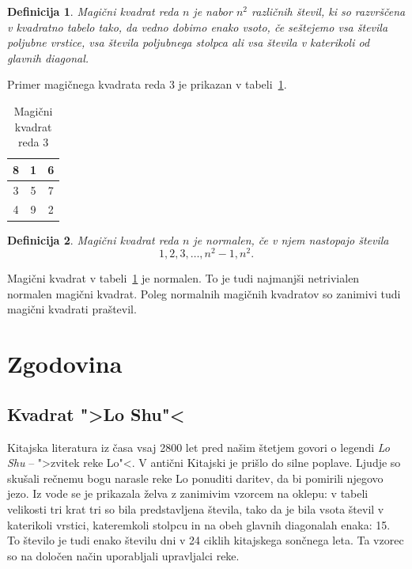 \documentclass[a4paper,12pt]{article}
\newtheorem{definicija}{Definicija}
\begin{document}
\begin{definicija}
   \emph{Magični kvadrat} reda \(n\) je nabor \(n^2\) različnih števil,
   ki so razvrščena v kvadratno tabelo tako, da vedno dobimo enako vsoto,
   če seštejemo vsa števila poljubne vrstice, vsa števila poljubnega
   stolpca ali vsa števila v katerikoli od glavnih diagonal.
\end{definicija}
Primer magičnega kvadrata reda 3 je prikazan v tabeli~\ref{table.mag3}. %
%   
\begin{table}[htp]
   \centering
   \caption{Magični kvadrat reda 3}
   \large
   \begin{tabular}{|c|c|c|}
      \hline
      8 & 1 & 6\\\hline
      3 & 5 & 7\\\hline
      4 & 9 & 2\\\hline
   \end{tabular}
   \normalsize
   \label{table.mag3}
\end{table}
\begin{definicija}
   Magični kvadrat reda \(n\) je \emph{normalen}, če v njem nastopajo števila
   \begin{equation}
      1, 2, 3, \ldots, n^2-1, n^2.
   \end{equation}
\end{definicija}
\label{eq:numbers}
Magični kvadrat v tabeli~\ref{table.mag3} je normalen.
To je tudi najmanjši netrivialen normalen magični kvadrat.
Poleg normalnih magičnih kvadratov so zanimivi tudi magični kvadrati praštevil. %


\section{Zgodovina}

\subsection{Kvadrat ">Lo Shu"<}

Kitajska literatura iz časa vsaj 2800 let pred našim štetjem govori o legendi
\emph{Lo Shu} -- ">zvitek reke Lo"<. V antični Kitajski je prišlo do
silne poplave. Ljudje so skušali rečnemu bogu narasle reke Lo ponuditi daritev,
da bi pomirili njegovo jezo. Iz vode se je prikazala želva z zanimivim vzorcem
na oklepu: v tabeli velikosti tri krat tri so bila predstavljena števila, tako
da je bila vsota števil v katerikoli vrstici, kateremkoli stolpcu in na obeh
glavnih diagonalah enaka: 15. To število je tudi enako številu dni v 24 ciklih
kitajskega sončnega leta. Ta vzorec so na določen način uporabljali upravljalci
reke.
\end{document}
